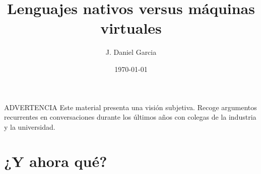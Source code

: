 \documentclass{beamer}
\title{Lenguajes nativos versus máquinas virtuales}
\author{J. Daniel Garcia}
\institute{Universidad Carlos III de Madrid}
\date{\today}
\begin{document}
\begin{frame}
\titlepage
\end{frame}



\begin{frame}{ADVERTENCIA}
Este material presenta una visión subjetiva.
\vfill
Recoge argumentos recurrentes en conversaciones durante los últimos años con colegas de la industria y la universidad.
\end{frame}







\section{¿Y ahora qué?}

\begin{frame}
\titlepage
\end{frame}
\end{document}
